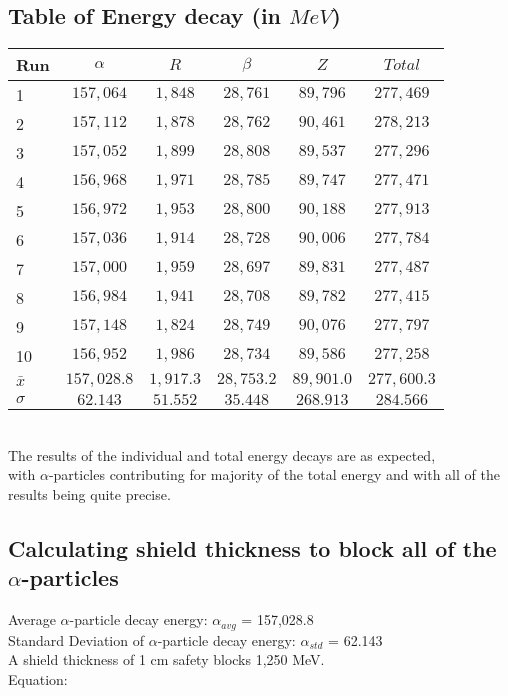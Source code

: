 \documentclass[12pt, letterpaper, twoside]{article}
\begin{document}
\subsection{Table of Energy decay (in $MeV$)}
\hspace{1.2cm}\begin{tabular}{|l| c | c | c | c | c |}
\hline
Run & $\alpha$ & $R$ & $\beta$ & $Z$ & $Total$ \\
\hline
1 & $157,064$ & $1,848$ & $28,761$ & $89,796$ & $277,469$ \\
2 & $157,112$ & $1,878$ & $28,762$ & $90,461$ & $278,213$ \\
3 & $157,052$ & $1,899$ & $28,808$ & $89,537$ & $277,296$\\
4 & $156,968$ & $1,971$ & $28,785$ & $89,747$ & $277,471$ \\
5 & $156,972$ & $1,953$ & $28,800$ & $90,188$ & $277,913$ \\
6 & $157,036$ & $1,914$ & $28,728$ & $90,006$ & $277,784$ \\
7 & $157,000$ & $1,959$ & $28,697$ & $89,831$ & $277,487$ \\
8 & $156,984$ & $1,941$ & $28,708$ & $89,782$ & $277,415$ \\
9 & $157,148$ & $1,824$ & $28,749$ & $90,076$ & $277,797$ \\
10 & $156,952$ & $1,986$ & $28,734$ & $89,586$ & $277,258$ \\
\hline
$\bar{x}$ & $157,028.8$ & $1,917.3$ & $28,753.2$ & $89,901.0$ & $277,600.3$ \\
\hline
$\sigma$ & $62.143$ & $51.552$ & $35.448$ & $268.913$ & $284.566$ \\
\hline
\end{tabular} \\

The results of the individual and total energy decays are as expected, \\ with $\alpha$-particles contributing for majority of the total energy and with all of the results being quite precise.  

\subsection{Calculating shield thickness to block all of the $\alpha$-particles}
Average $\alpha$-particle decay energy: $\alpha_{avg}$ = 157,028.8 \\
Standard Deviation of $\alpha$-particle decay energy: $\alpha_{std}$ = 62.143 \\
A shield thickness of 1 cm safety blocks 1,250 MeV. \\
Equation: 
\end{document}

